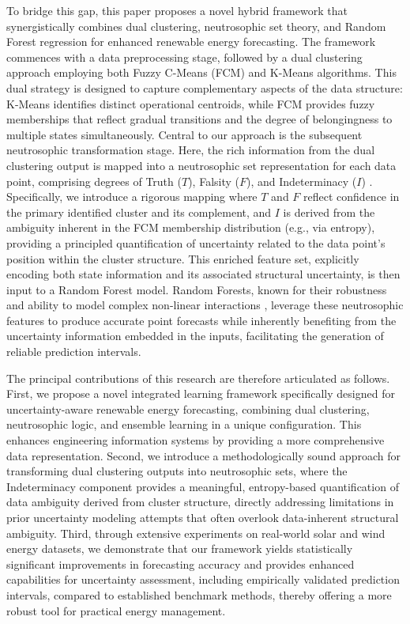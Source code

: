 \documentclass[review,3p,times]{elsarticle}
\begin{document}
To bridge this gap, this paper proposes a novel hybrid framework that synergistically combines dual clustering, neutrosophic set theory, and Random Forest regression for enhanced renewable energy forecasting. The framework commences with a data preprocessing stage, followed by a dual clustering approach employing both Fuzzy C-Means (FCM) \cite{bezdek1984fcm} and K-Means algorithms. This dual strategy is designed to capture complementary aspects of the data structure: K-Means identifies distinct operational centroids, while FCM provides fuzzy memberships that reflect gradual transitions and the degree of belongingness to multiple states simultaneously. Central to our approach is the subsequent neutrosophic transformation stage. Here, the rich information from the dual clustering output is mapped into a neutrosophic set representation for each data point, comprising degrees of Truth ($T$), Falsity ($F$), and Indeterminacy ($I$) \cite{alkhazaleh2015neutrosophic}. Specifically, we introduce a rigorous mapping where $T$ and $F$ reflect confidence in the primary identified cluster and its complement, and $I$ is derived from the ambiguity inherent in the FCM membership distribution (e.g., via entropy), providing a principled quantification of uncertainty related to the data point's position within the cluster structure. This enriched feature set, explicitly encoding both state information and its associated structural uncertainty, is then input to a Random Forest model. Random Forests, known for their robustness and ability to model complex non-linear interactions \cite{breiman2001random}, leverage these neutrosophic features to produce accurate point forecasts while inherently benefiting from the uncertainty information embedded in the inputs, facilitating the generation of reliable prediction intervals.

The principal contributions of this research are therefore articulated as follows. First, we propose a novel integrated learning framework specifically designed for uncertainty-aware renewable energy forecasting, combining dual clustering, neutrosophic logic, and ensemble learning in a unique configuration. This enhances engineering information systems by providing a more comprehensive data representation. Second, we introduce a methodologically sound approach for transforming dual clustering outputs into neutrosophic sets, where the Indeterminacy component provides a meaningful, entropy-based quantification of data ambiguity derived from cluster structure, directly addressing limitations in prior uncertainty modeling attempts that often overlook data-inherent structural ambiguity. Third, through extensive experiments on real-world solar and wind energy datasets, we demonstrate that our framework yields statistically significant improvements in forecasting accuracy and provides enhanced capabilities for uncertainty assessment, including empirically validated prediction intervals, compared to established benchmark methods, thereby offering a more robust tool for practical energy management.
\end{document}
